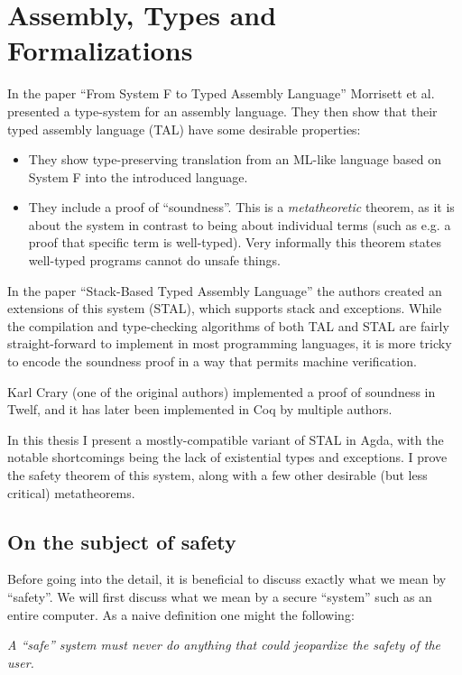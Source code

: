 \chapter{Assembly, Types and Formalizations}

In the paper ``From System F to Typed Assembly Language'' Morrisett et
al. presented a type-system for an assembly language. They then show that their
typed assembly language (TAL) have some desirable properties:

\begin{itemize}
\item They show type-preserving translation from an ML-like language based on
  System F into the introduced language.
\item They include a proof of ``soundness''. This is a \emph{metatheoretic}
  theorem, as it is about the system in contrast to being about individual terms
  (such as e.g. a proof that specific term is well-typed). Very informally this
  theorem states well-typed programs cannot do unsafe things.
\end{itemize}

In the paper ``Stack-Based Typed Assembly Language'' the authors created an
extensions of this system (STAL), which supports stack and exceptions. While the
compilation and type-checking algorithms of both TAL and STAL are fairly
straight-forward to implement in most programming languages, it is more tricky
to encode the soundness proof in a way that permits machine verification.

Karl Crary (one of the original authors) implemented a proof of soundness in
Twelf, and it has later been implemented in Coq by multiple
authors.

In this thesis I present a mostly-compatible variant of STAL in Agda, with the
notable shortcomings being the lack of existential types and exceptions. I prove
the safety theorem of this system, along with a few other desirable (but less
critical) metatheorems.

\section{On the subject of safety}

Before going into the detail, it is beneficial to discuss exactly what we mean
by ``safety''. We will first discuss what we mean by a secure ``system'' such as
an entire computer. As a naive definition one might the following:

\vspace{0.3cm}
\begin{addmargin}{1cm}
  {\it A ``safe'' system must never do anything that could jeopardize the
    safety of the user.}
\end{addmargin}
\vspace{0.3cm}

